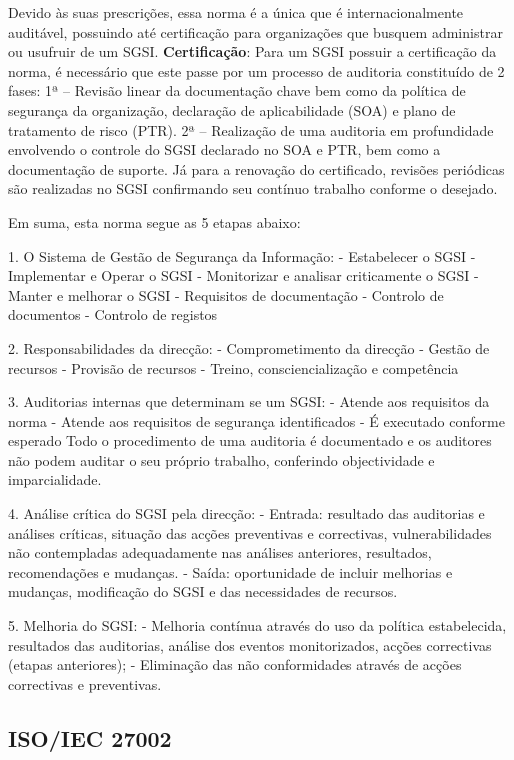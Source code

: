 \documentclass[12pt]{article}
\begin{document}
Devido às suas prescrições, essa norma é a única que é internacionalmente auditável, possuindo até
certificação
para organizações que busquem administrar ou usufruir de um SGSI.
\textbf{Certificação}: Para um SGSI possuir a certificação da norma, é necessário que este passe por um processo de auditoria constituído de 2 fases:
1ª – Revisão linear da documentação chave bem como da política de segurança da organização, declaração de aplicabilidade (SOA) e plano de tratamento de risco (PTR).
2ª – Realização de uma auditoria em profundidade envolvendo o controle do SGSI declarado no SOA e PTR, bem como a documentação de suporte.
Já para a renovação do certificado, revisões periódicas são realizadas no SGSI confirmando seu contínuo trabalho conforme o desejado.

Em suma, esta norma segue as 5 etapas abaixo:

1. O Sistema de Gestão de Segurança da Informação:
- Estabelecer o SGSI
- Implementar e Operar o SGSI
- Monitorizar e analisar criticamente o SGSI
- Manter e melhorar o SGSI
- Requisitos de documentação
- Controlo de documentos
- Controlo de registos

2. Responsabilidades da direcção:
- Comprometimento da direcção
- Gestão de recursos
- Provisão de recursos
- Treino, consciencialização e competência

3. Auditorias internas que determinam se um SGSI:
- Atende aos requisitos da norma
- Atende aos requisitos de segurança identificados
- É executado conforme esperado
Todo o procedimento de uma auditoria é documentado e os auditores não podem
auditar o seu próprio trabalho, conferindo objectividade e imparcialidade.

4. Análise crítica do SGSI pela direcção:
- Entrada: resultado das auditorias e análises críticas, situação das acções preventivas e
correctivas, vulnerabilidades não contempladas adequadamente nas análises anteriores,
resultados, recomendações e mudanças.
- Saída: oportunidade de incluir melhorias e mudanças, modificação do SGSI e das
necessidades de recursos.

5. Melhoria do SGSI:
- Melhoria contínua através do uso da política estabelecida, resultados das auditorias,
análise dos eventos monitorizados, acções correctivas (etapas anteriores);
- Eliminação das não conformidades através de acções correctivas e preventivas.

\subsection{ISO/IEC 27002}
\end{document}
